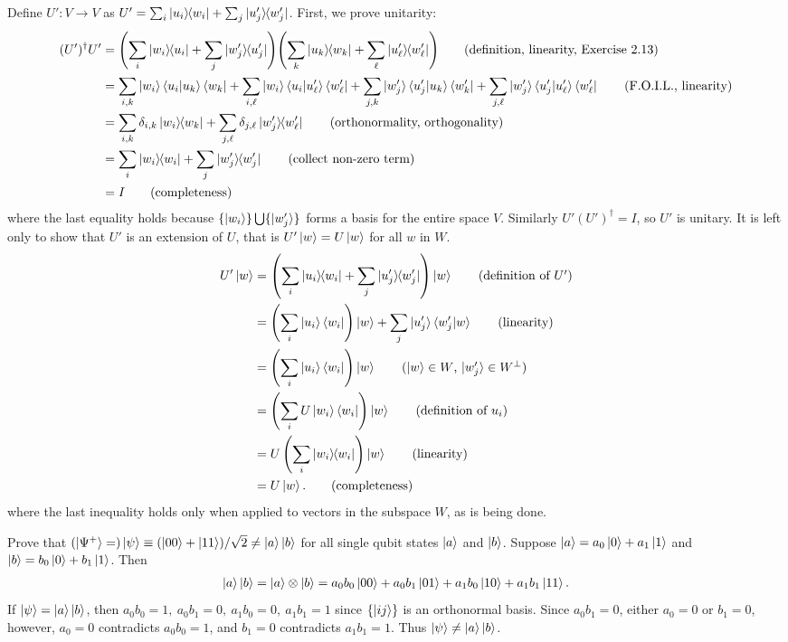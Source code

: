 Define $U': V \rightarrow V$ as $U' = \sum_i \ket{u_i}\hspace{-1mm} \bra{w_i} + \sum_j \ket{u_j'}\hspace{-1mm} \bra{w_j'}$.  First, we prove unitarity:
\begin{align*}
    (U')^\dagger U' &= \Biggl( \sum_{i} \kbt{w_i}{u_i} + \sum_{j} \kbt{w_j'}{u_j'} \Biggr)  \Biggl( \sum_k \kbt{u_k}{w_k} + \sum_\ell \kbt{u_\ell'}{w_\ell'} \Biggr)\tag{definition, linearity, Exercise 2.13}\\
    &=\sum_{i,k}\ket{w_i}\braket{u_i|u_k}\bra{w_k} + \sum_{i,\ell} \ket{w_i}\braket{u_i|u_\ell'}\bra{w_\ell'}+  \sum_{j,k} \ket{w_j'}\braket{u_j'|u_k}\bra{w_k'} + \sum_{j,\ell}  \ket{w_j'}\braket{u_j'|u_\ell'}\bra{w_\ell'} \tag{F.O.I.L., linearity} \\
    &= \sum_{i,k}\delta_{i,k}\kbt{w_i}{w_k} + \sum_{j,\ell}\delta_{j,\ell}\kbt{w_j'}{w_\ell'} \tag{orthonormality, orthogonality} \\
                    &= \sum_i \kb{w_i} + \sum_j \kb{w_j'} \tag{collect non-zero term} \\
                    &= I \tag{completeness}
\end{align*}
where the last equality holds because $\{\ket{w_i}\}\bigcup\{\ket{w_j'}\}$ forms a basis for the entire space $V$.  Similarly $U'(U')^\dagger = I$,  so $U'$ is unitary. It is left only to show that $U'$ is an extension of $U$, that is $U'\ket{w} = U\ket{w}$ for all $w$ in $W$.
\begin{align*}
    U' \ket{w} &= \left( \sum_i \kbt{u_i}{w_i} + \sum_j \kbt{u_j'}{w_j'} \right) \ket{w} \tag{definition of $U'$} \\
               &= \left(\sum_i \ket{u_i} \bra{w_i}\right) \ket{w} + \sum_j \ket{u_j'} \braket{w_j' | w} \tag{linearity}\\
			   &=  \left(\sum_i \ket{u_i} \bra{w_i}\right) \ket{w}  \tag{$\ket{w}\in W$, $\ket{w_j'} \in W^\perp$}\\
			   &= \left(\sum_i U \ket{w_i} \bra{w_i}\right) \ket{w}\tag{definition of $u_i$}\\
			   &= U\left(\sum_i \kb{w_i}\right)\ket{w} \tag{linearity}\\
			   &= U \ket{w}. \tag{completeness}
\end{align*}
where the last inequality holds only when applied to vectors in the subspace $W$, as is being done.

  Prove that $(\ket{\Psi^+} =)\ket{\psi}\equiv (\ket{00}+\ket{11})/\sqrt{2} \neq \ket{a}\ket{b}$ for all single qubit states $\ket{a}$ and $\ket{b}$.
\Soln
Suppose $\ket{a} = a_0 \ket{0}  + a_1\ket{1}$ and $\ket{b} = b_0 \ket{0}  + b_1\ket{1}$.  Then
\begin{align*}
    \ket{a} \ket{b} =\ket{a}\otimes\ket{b} = a_0 b_0 \ket{00} + a_0 b_1 \ket{01} + a_1 b_0 \ket{10} + a_1 b_1 \ket{11}.
\end{align*}
If $\ket{\psi} = \ket{a} \ket{b}$, then $a_0 b_0 = 1,~ a_0 b_1=0,~ a_1 b_0 = 0,~ a_1 b_1 = 1$ since $\{\ket{ij}\}$ is an orthonormal basis. Since $a_0 b_1 = 0$, either $a_0 = 0$ or $b_1 = 0$, however, $a_0 = 0$ contradicts $a_0 b_0 = 1$, and $b_1 = 0$ contradicts $a_1 b_1 = 1$. Thus $\ket{\psi} \neq \ket{a} \ket{b}$.


